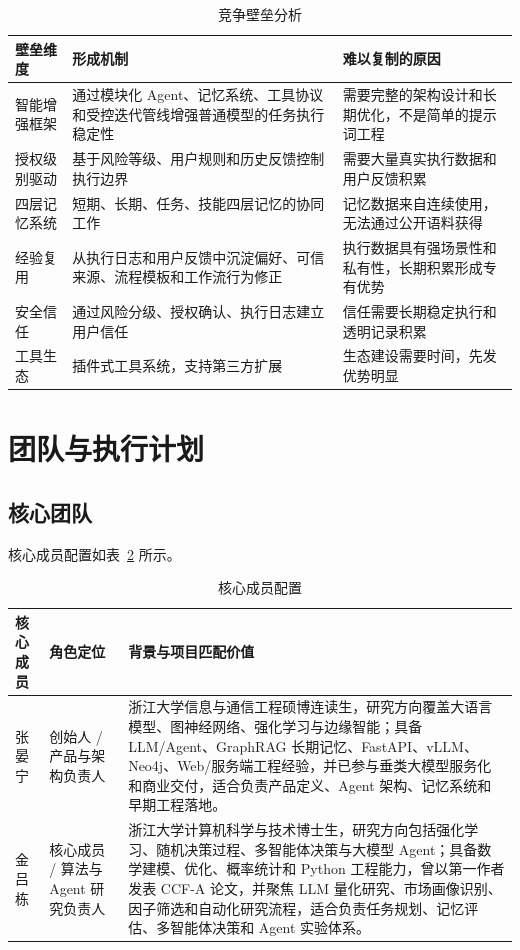 \documentclass[12pt,a4paper]{ctexart}
\begin{document}
\begin{table}[htbp]
  \centering
  \small
  \begin{tabularx}{\textwidth}{p{3cm} X X}
    \toprule
    \textbf{壁垒维度} & \textbf{形成机制} & \textbf{难以复制的原因} \\
    \midrule
    智能增强框架 & 通过模块化 Agent、记忆系统、工具协议和受控迭代管线增强普通模型的任务执行稳定性 & 需要完整的架构设计和长期优化，不是简单的提示词工程 \\
    授权级别驱动 & 基于风险等级、用户规则和历史反馈控制执行边界 & 需要大量真实执行数据和用户反馈积累 \\
    四层记忆系统 & 短期、长期、任务、技能四层记忆的协同工作 & 记忆数据来自连续使用，无法通过公开语料获得 \\
    经验复用 & 从执行日志和用户反馈中沉淀偏好、可信来源、流程模板和工作流行为修正 & 执行数据具有强场景性和私有性，长期积累形成专有优势 \\
    安全信任 & 通过风险分级、授权确认、执行日志建立用户信任 & 信任需要长期稳定执行和透明记录积累 \\
    工具生态 & 插件式工具系统，支持第三方扩展 & 生态建设需要时间，先发优势明显 \\
    \bottomrule
  \end{tabularx}
  \caption{竞争壁垒分析}
  \label{tab:barriers-new}
\end{table}

\section{团队与执行计划}

\subsection{核心团队}

核心成员配置如表~\ref{tab:team} 所示。

\begin{table}[htbp]
  \centering
  \begin{tabularx}{\textwidth}{p{3.1cm} p{3.2cm} X}
    \toprule
    \textbf{核心成员} & \textbf{角色定位} & \textbf{背景与项目匹配价值} \\
    \midrule
    张晏宁 & 创始人 / 产品与架构负责人 & 浙江大学信息与通信工程硕博连读生，研究方向覆盖大语言模型、图神经网络、强化学习与边缘智能；具备 LLM/Agent、GraphRAG 长期记忆、FastAPI、vLLM、Neo4j、Web/服务端工程经验，并已参与垂类大模型服务化和商业交付，适合负责产品定义、Agent 架构、记忆系统和早期工程落地。 \\
    金吕栋 & 核心成员 / 算法与 Agent 研究负责人 & 浙江大学计算机科学与技术博士生，研究方向包括强化学习、随机决策过程、多智能体决策与大模型 Agent；具备数学建模、优化、概率统计和 Python 工程能力，曾以第一作者发表 CCF-A 论文，并聚焦 LLM 量化研究、市场画像识别、因子筛选和自动化研究流程，适合负责任务规划、记忆评估、多智能体决策和 Agent 实验体系。 \\
    \bottomrule
  \end{tabularx}
  \caption{核心成员配置}
  \label{tab:team}
\end{table}
\end{document}
